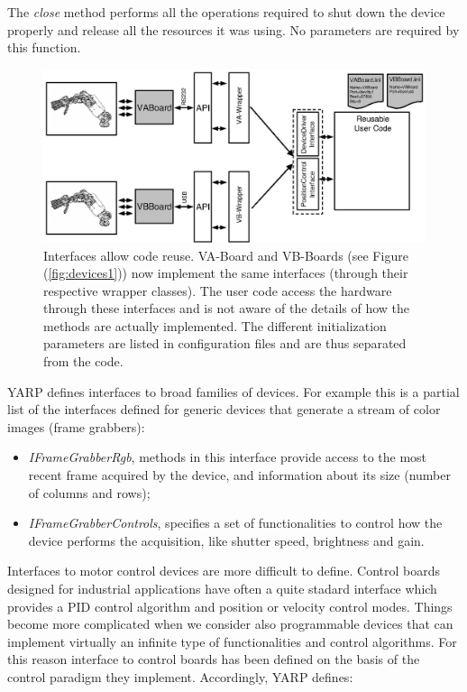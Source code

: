 The \emph{close} method performs all the operations required to shut down 
the device properly and release all the resources it was using. No
parameters are required by this function.

\begin{figure}[tbp]
\centerline{
\includegraphics[width=24cm]{fig-devices2}
}
\caption{Interfaces allow code reuse. VA-Board and VB-Boards (see 
Figure (\ref{fig:devices1})) now implement
the same interfaces (through their respective wrapper classes). The user 
code access the hardware through these interfaces and is not aware of 
the details of how the methods are actually implemented. The different 
initialization parameters are listed in configuration files and are thus 
separated from the code.}\label{fig:devices2}
\end{figure}

YARP defines interfaces to broad families of devices. For 
example this is a partial list of the interfaces defined for generic 
devices that generate a stream of color images (frame grabbers):

\begin{itemize}

\item \emph{IFrameGrabberRgb}, methods in this interface 
provide access to the most recent frame acquired by the device, and 
information about its size (number of columns and rows);

\item \emph{IFrameGrabberControls}, specifies a set of functionalities 
to control how the device performs the acquisition, like shutter speed, 
brightness and gain.

\end{itemize}

Interfaces to motor control devices are more difficult to define. Control 
boards designed for industrial applications have often a quite stadard 
interface which provides a PID control algorithm and position or velocity 
control modes. Things become more complicated when we consider also 
programmable devices that can implement virtually an infinite type of 
functionalities and control algorithms. 
For this reason interface to control boards has been defined on the basis 
of the control paradigm they implement. Accordingly, YARP defines:

